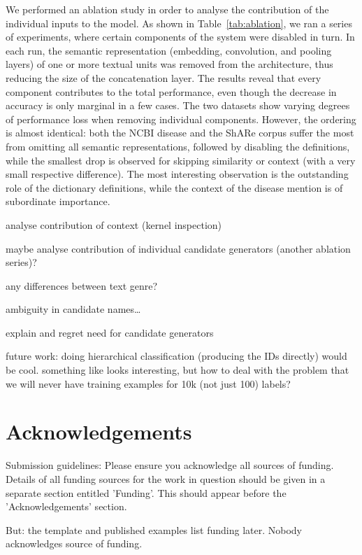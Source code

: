 \documentclass{bioinfo}
\begin{document}
We performed an ablation study in order to analyse the contribution of the individual inputs to the model.
As shown in Table~\ref{tab:ablation}, we ran a series of experiments, where certain components of the system were disabled in turn.
In each run, the semantic representation (embedding, convolution, and pooling layers) of one or more textual units was removed from the architecture, thus reducing the size of the concatenation layer.
The results reveal that every component contributes to the total performance, even though the decrease in accuracy is only marginal in a few cases.
The two datasets show varying degrees of performance loss when removing individual components.
However, the ordering is almost identical: both the NCBI disease and the ShARe corpus suffer the most from omitting all semantic representations, followed by disabling the definitions, while the smallest drop is observed for skipping similarity or context (with a very small respective difference).
The most interesting observation is the outstanding role of the dictionary definitions, while the context of the disease mention is of subordinate importance.


analyse contribution of context (kernel inspection)

maybe analyse contribution of individual candidate generators (another ablation series)?

any differences between text genre?

ambiguity in candidate names\dots

explain and regret need for candidate generators

future work: doing hierarchical classification (producing the IDs directly) would be cool. something like \cite{guo-et-al:2018} looks interesting, but how to deal with the problem that we will never have training examples for 10k (not just 100) labels?



\section*{Acknowledgements}

Submission guidelines:
Please ensure you acknowledge all sources of funding.
Details of all funding sources for the work in question should be given in a separate section entitled 'Funding'. This should appear before the 'Acknowledgements' section.

But: the template and published examples list funding later.
Nobody acknowledges source of funding.
\vspace*{-12pt}
\end{document}
